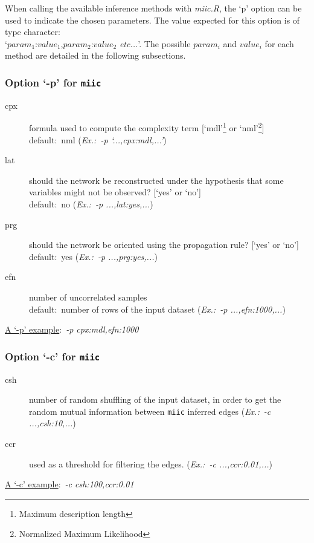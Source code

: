 \documentclass[12pt]{article}
\begin{document}
When calling the available inference methods with \emph{miic.R}, the `p' option can be used to indicate the chosen parameters. The value expected for this option is of type character:\\ `$param_{1}$:$value_{1}$,$param_{2}$:$value_{2}$ \textit{etc...}'. The possible $param_{i}$ and $value_{i}$ for each method are detailed in the following subsections.

\subsubsection*{Option `-p' for {\tt\bfseries miic}}

\begin{description}
	\item[cpx] formula used to compute the complexity term [`mdl'\footnote{Maximum description length} or `nml'\footnote{Normalized Maximum Likelihood}]\\default:~nml (\textit{\small{Ex.:~-p `...,cpx:mdl,...'}})
	\item[lat] should the network be reconstructed under the hypothesis that some variables might not be observed? 
	[`yes' or `no'] \\default:~no (\textit{\small{Ex.:~-p ...,lat:yes,...}})	
	\item[prg] should the network be oriented using the propagation rule? 
	[`yes' or `no'] \\default:~yes (\textit{\small{Ex.:~-p ...,prg:yes,...}})
	
	
	\item[efn] number of uncorrelated samples\\default:~number of rows of the input dataset (\textit{\small{Ex.:~-p ...,efn:1000,...}})

\end{description}

\underline{A `-p' example}:~\textit{\small{-p cpx:mdl,efn:1000}}


\subsubsection*{Option `-c' for {\tt\bfseries miic}}\label{sssec:optionC}
\begin{description}
	\item[csh] number of random shuffling of the input dataset, in order to get the random mutual information between {\tt miic} inferred edges  		(\textit{\small{Ex.:~-c ...,csh:10,...}})
	\item[ccr] {\color{black}{confidence ratio}} used as a threshold for filtering the edges. (\textit{\small{Ex.:~-c ...,ccr:0.01,...}})
\end{description}
\underline{A `-c' example}:~\textit{\small{-c csh:100,ccr:0.01}}
\end{document}
